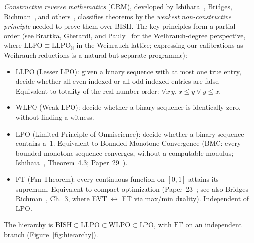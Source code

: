\documentclass[11pt,a4paper]{article}
\theoremstyle{plain}
\theoremstyle{definition}
\newcommand{\NN}{\mathbb{N}}
\newcommand{\LPO}{\ensuremath{\mathrm{LPO}}}
\newcommand{\LLPO}{\ensuremath{\mathrm{LLPO}}}
\newcommand{\WLPO}{\ensuremath{\mathrm{WLPO}}}
\newcommand{\BISH}{\ensuremath{\mathrm{BISH}}}
\newcommand{\BMC}{\ensuremath{\mathrm{BMC}}}
\newcommand{\FT}{\ensuremath{\mathrm{FT}}}
\begin{document}
\emph{Constructive reverse mathematics} (CRM), developed by
Ishihara~\cite{Ishihara2006}, Bridges, Richman~\cite{BR1987}, and
others~\cite{Diener2018,BIRSH2023}, classifies theorems by the
\emph{weakest non-constructive principle} needed to prove them
over $\BISH$.  The key principles form a partial order
(see Brattka, Gherardi, and Pauly~\cite{BrattkaEtAl2012} for the
Weihrauch-degree perspective, where $\LLPO \equiv \LLPO_\NN$ in
the Weihrauch lattice; expressing our calibrations as Weihrauch
reductions is a natural but separate programme):
\begin{itemize}[nosep]
\item $\LLPO$ (Lesser LPO): given a binary sequence with at most
  one true entry, decide whether all even-indexed or all
  odd-indexed entries are false.  Equivalent to totality of the
  real-number order: $\forall x\,y.\; x \leq y \lor y \leq x$.
\item $\WLPO$ (Weak LPO): decide whether a binary sequence is
  identically zero, without finding a witness.
\item $\LPO$ (Limited Principle of Omniscience): decide whether a
  binary sequence contains a~1.  Equivalent to Bounded Monotone
  Convergence ($\BMC$: every bounded monotone sequence converges,
  without a computable modulus; Ishihara~\cite{Ishihara2006},
  Theorem~4.3; Paper~29~\cite{Lee26P29}).
\item $\FT$ (Fan Theorem): every continuous function on $[0,1]$
  attains its supremum.  Equivalent to compact optimization
  (Paper~23~\cite{Lee26P23}; see also Bridges-Richman~\cite{BR1987},
  Ch.~3, where EVT $\leftrightarrow$ FT via max/min duality).
  Independent of $\LPO$.
\end{itemize}
The hierarchy is $\BISH \subset \LLPO \subset \WLPO \subset \LPO$,
with $\FT$ on an independent branch (Figure~\ref{fig:hierarchy}).
\end{document}
